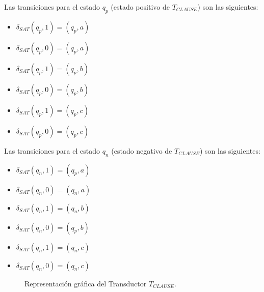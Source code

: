 \documentclass[12pt]{article}
\begin{document}
Las transiciones para el estado $q_p$ (estado positivo de $T_{CLAUSE}$) son las siguientes:
\begin{multicols}{2}
    \begin{itemize}
        \item $\delta_{SAT}(q_{p},1)=(q_{p},a)$
        \item $\delta_{SAT}(q_{p},0)=(q_{p},a)$
        \item $\delta_{SAT}(q_{p},1)=(q_{p},b)$
        \item $\delta_{SAT}(q_{p},0)=(q_{p},b)$
        \item $\delta_{SAT}(q_{p},1)=(q_{p},c)$
        \item $\delta_{SAT}(q_{p},0)=(q_{p},c)$
    \end{itemize}
\end{multicols}

Las transiciones para el estado $q_n$ (estado negativo de $T_{CLAUSE}$) son las siguientes:
\begin{multicols}{2}
    \begin{itemize}
        \item $\delta_{SAT}(q_{n},1)=(q_{p},a)$
        \item $\delta_{SAT}(q_{n},0)=(q_{n},a)$
        \item $\delta_{SAT}(q_{n},1)=(q_{n},b)$
        \item $\delta_{SAT}(q_{n},0)=(q_{p},b)$
        \item $\delta_{SAT}(q_{n},1)=(q_{n},c)$
        \item $\delta_{SAT}(q_{n},0)=(q_{n},c)$
    \end{itemize}
\end{multicols}

\begin{figure}[h]
    \centering  \begin{otherlanguage}{english}
    \end{otherlanguage}
    \caption{Representación gráfica del Transductor $T_{CLAUSE}$.}
    \label{fig:transducer_clause} %
\end{figure}
\end{document}

